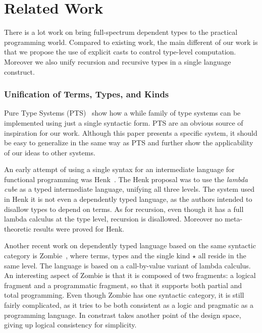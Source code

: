 \section{Related Work}
\label{sec:related}

There is a lot work on bring full-spectrum dependent types to the
practical programming world. Compared to existing work, the main 
different of our work is that we propose the use of explicit casts 
to control type-level computation. Moreover we also unify recursion 
and recursive types in a single language construct.

\subsubsection{Unification of Terms, Types, and Kinds}
Pure Type Systems (PTS)~\cite{pts} show how a while family of type systems
can be implemented using just a single syntactic form. PTS are an
obvious source of inspiration for our work. Although this paper
presents a specific system, it should be easy to generalize \name 
in the same way as PTS and further show the applicability of our 
ideas to other systems. 

An early attempt of using a single syntax for an intermediate language
for functional programming was Henk~\cite{pts:henk}. The Henk proposal
was to use the \emph{lambda cube} as a typed intermediate language,
unifying all three levels. The system used in Henk
it is not even a dependently typed
language, as the authors intended to  disallow types to depend
on terms. As for recursion, even though it has a full lambda calculus
at the type level, recursion is disallowed. Moreover no meta-theoretic 
results were proved for Henk.

\begin{comment}
Since the implicit conversion of the lambda
cube is not syntax-directed, they come up with a approach to
strategically distribute the conversion rule over the other typing
rules. In retrospect, Henk is quite conservative in terms of
type-level computation. Actually it is not even a dependently typed
language, as they clearly state that they don't allow types to depend
on terms. As for recursion, even though it has a full lambda calculus
at the type level, recursion is disallowed. In Henk the authors have
not attempted to prove any meta-theoretic results.
\end{comment}

Another recent work on dependently typed language based on the same
syntactic category is \textsf{Zombie}~\cite{zombie:popl14,
  zombie:thesis}, where terms, types and the single kind $\star$ all
reside in the same level. The language is based on a call-by-value
variant of lambda calculus. An interesting aspect of Zombie is that
it is composed of two fragments: a logical fragment and a programmatic
fragment, so that it supports both partial and total programming. Even
though Zombie has one syntactic category, it is still fairly
complicated, as it tries to be both consistent as a logic and
pragmatic as a programming language. In constrast \name takes 
another point of the design space, giving up logical consistency 
for simplicity.

